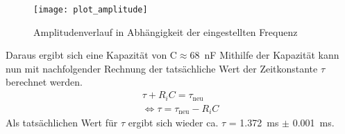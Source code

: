 \begin{figure}
\centering
\texttt{[image: plot\_amplitude]}
\caption{Amplitudenverlauf in Abhängigkeit der eingestellten Frequenz}
\label{fig:plot_amplitude}
\end{figure}
Daraus ergibt sich eine Kapazität von C$\approx$\SI{68}{\nano\farad}
Mithilfe der Kapazität kann nun mit nachfolgender Rechnung der tatsächliche Wert der Zeitkonstante $\tau$ berechnet werden.
\begin{equation*}
  \begin{split}
    \tau + R_i C = \tau_\text{neu}\\
	\Leftrightarrow \tau = \tau_\text{neu} - R_i C
  \end{split}
\end{equation*}
Als tatsächlichen Wert für $\tau$ ergibt sich wieder ca. $\tau$ = \SI{1.372}{\milli\second} $\pm$ \SI{0.001}{\milli\second}.
